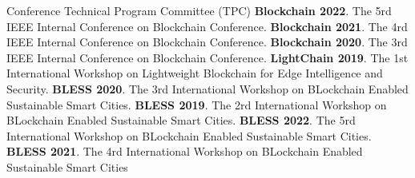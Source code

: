 \begin{rubric}{Conference Technical Program Committee (TPC)}
\entry*[]
\textbf{Blockchain 2022}. The 5rd IEEE Internal Conference on Blockchain Conference.
%
\entry*[]
\textbf{Blockchain 2021}. The 4rd IEEE Internal Conference on Blockchain Conference.
%
\entry*[]
\textbf{Blockchain 2020}. The 3rd IEEE Internal Conference on Blockchain Conference.
%
\entry*[] \textbf{LightChain 2019}. The 1st International Workshop on Lightweight Blockchain for Edge Intelligence and Security.
%
\entry*[]
\textbf{BLESS 2020}. The 3rd International Workshop on BLockchain Enabled Sustainable Smart Cities.
%
\entry*[]
\textbf{BLESS 2019}. The 2rd International Workshop on BLockchain Enabled Sustainable Smart Cities.
%
\entry*[]
\textbf{BLESS 2022}. The 5rd International Workshop on BLockchain Enabled Sustainable Smart Cities.
%
\entry*[]
\textbf{BLESS 2021}. The 4rd International Workshop on BLockchain Enabled Sustainable Smart Cities
%
\end{rubric}